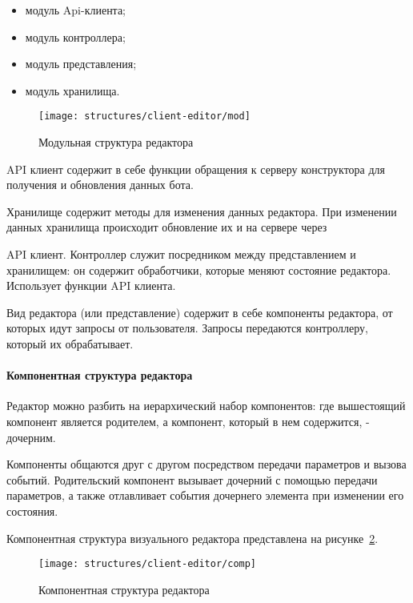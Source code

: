 \begin{itemize}
	\item модуль Api-клиента;
	\item модуль контроллера;
	\item модуль представления;
	\item модуль хранилища.
\end{itemize}

\begin{figure}[!ht]
	\centering
	\vspace{\toppaddingoffigure}
	\texttt{[image: structures/client-editor/mod]}
	\caption{Модульная структура редактора}
	\label{f:mod-client-editor-struct}
\end{figure}


API клиент содержит в себе функции обращения к серверу конструктора
для получения и обновления данных бота.

Хранилище содержит методы для изменения данных редактора. При
изменении данных хранилища происходит обновление их и на сервере через

API клиент.
Контроллер служит посредником между представлением и хранилищем:
он содержит обработчики, которые меняют состояние редактора. Использует
функции API клиента.

Вид редактора (или представление) содержит в себе компоненты
редактора, от которых идут запросы от пользователя. Запросы передаются
контроллеру, который их обрабатывает.


\paragraph{Компонентная структура редактора}

Редактор можно разбить на иерархический набор компонентов: где
вышестоящий компонент является родителем, а компонент, который в нем
содержится, - дочерним.

Компоненты общаются друг с другом посредством передачи параметров
и вызова событий. Родительский компонент вызывает дочерний с помощью
передачи параметров, а также отлавливает события дочернего элемента при
изменении его состояния.

Компонентная структура визуального редактора представлена на
рисунке~\ref{f:comp-client-editor-struct}.

\begin{figure}[!ht]
	\centering
	\vspace{\toppaddingoffigure}
	\texttt{[image: structures/client-editor/comp]}
	\caption{Компонентная структура редактора}
	\label{f:comp-client-editor-struct}
\end{figure}

